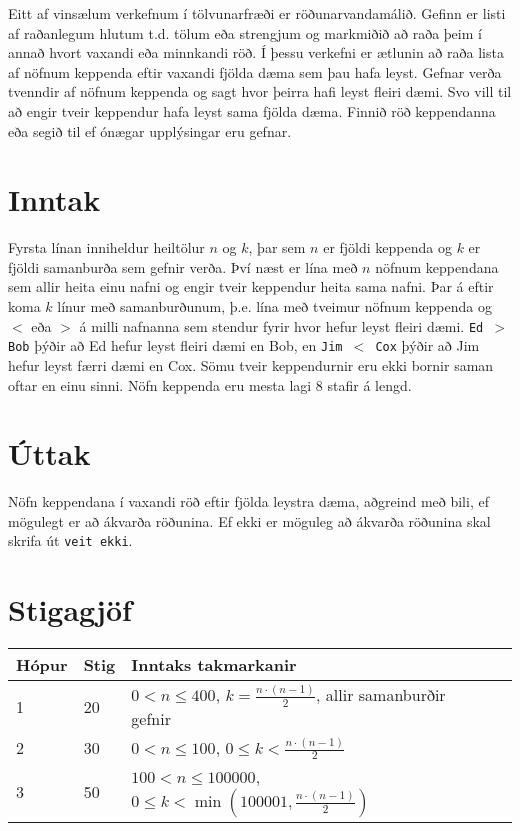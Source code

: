 Eitt af vinsælum verkefnum í tölvunarfræði er röðunarvandamálið. Gefinn er listi af raðanlegum hlutum t.d. tölum eða strengjum og markmiðið að raða þeim í annað hvort vaxandi eða minnkandi röð. Í þessu verkefni er ætlunin að raða lista af nöfnum keppenda eftir vaxandi fjölda dæma sem þau hafa leyst. Gefnar verða tvenndir af nöfnum keppenda og sagt hvor þeirra hafi leyst fleiri dæmi. Svo vill til að engir tveir keppendur hafa leyst sama fjölda dæma. Finnið röð keppendanna eða segið til ef ónægar upplýsingar eru gefnar.

\section*{Inntak}
Fyrsta línan inniheldur heiltölur $n$ og $k$, þar sem $n$ er fjöldi keppenda og $k$ er fjöldi samanburða sem gefnir verða. Því næst er lína með $n$ nöfnum keppendana sem allir heita einu nafni og engir tveir keppendur heita sama nafni. Þar á eftir koma $k$ línur með samanburðunum, þ.e. lína með tveimur nöfnum keppenda og $<$ eða $>$ á milli nafnanna sem stendur fyrir hvor hefur leyst fleiri dæmi. \texttt{Ed $>$ Bob}  þýðir að Ed hefur leyst fleiri dæmi en Bob, en \texttt{Jim $<$ Cox} þýðir að Jim hefur leyst færri dæmi en Cox. Sömu tveir keppendurnir eru ekki bornir saman oftar en einu sinni. Nöfn keppenda eru mesta lagi $8$ stafir á lengd.

\section*{Úttak}
Nöfn keppendana í vaxandi röð eftir fjölda leystra dæma, aðgreind með bili, ef mögulegt er að ákvarða röðunina. Ef ekki er möguleg að ákvarða röðunina skal skrifa út \texttt{veit ekki}.

\section*{Stigagjöf}
\begin{tabular}{|l|l|l|l|}
\hline
Hópur & Stig & Inntaks takmarkanir \\ \hline
    1     & 20  & $0 < n \leq 400$, $k = \frac{n \cdot (n-1)}{2}$, allir samanburðir gefnir \\ \hline
    2     & 30  & $0 < n \leq 100$, $0 \leq k < \frac{n \cdot (n-1)}{2}$ \\ \hline
    3     & 50  & $100 < n \leq 100000$, $0 \leq k < \min\left(100001, \frac{n \cdot (n-1)}{2}\right)$ \\ \hline
\end{tabular}
